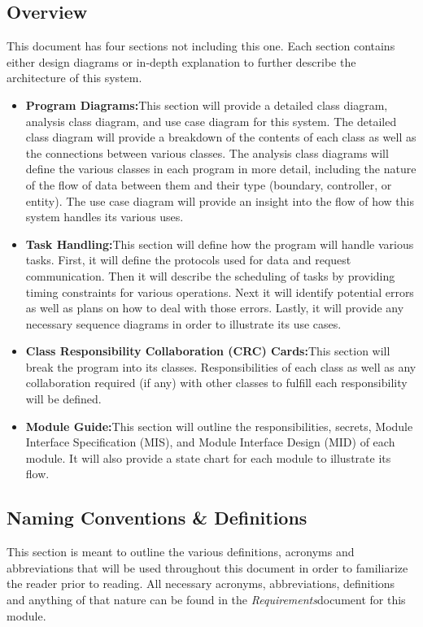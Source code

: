 \documentclass[titlepage]{article}
\begin{document}
\subsection{Overview}
This document has four sections not including this one. Each section contains either design diagrams or in-depth explanation to further describe the architecture of this system.\\
\begin{itemize}
	\item \textbf{Program Diagrams:}This section will provide a detailed class diagram, analysis class diagram, and use case diagram for this system. The detailed class diagram will provide a breakdown of the contents of each class as well as the connections between various classes. The analysis class diagrams will define the various classes in each program in more detail, including the nature of the flow of data between them and their type (boundary, controller, or entity). The use case diagram will provide an insight into the flow of how this system handles its various uses.
	\item \textbf{Task Handling:}This section will define how the program will handle various tasks. First, it will define the protocols used for data and request communication. Then it will describe the scheduling of tasks by providing timing constraints for various operations. Next it will identify potential errors as well as plans on how to deal with those errors. Lastly, it will provide any necessary sequence diagrams in order to illustrate its use cases.
	\item \textbf{Class Responsibility Collaboration (CRC) Cards:}This section will break the program into its classes. Responsibilities of each class as well as any collaboration required (if any) with other classes to fulfill each responsibility will be defined.
	\item \textbf{Module Guide:}This section will outline the responsibilities, secrets, Module Interface Specification (MIS), and Module Interface Design (MID) of each module. It will also provide a state chart for each module to illustrate its flow.
\end{itemize}
\subsection{Naming Conventions \& Definitions}
This section is meant to outline the various definitions, acronyms and abbreviations that will be used throughout this document in order to familiarize the reader prior to reading. All necessary acronyms, abbreviations, definitions and anything of that nature can be found in the \textit{Requirements}document for this module.
\newpage
\end{document}
